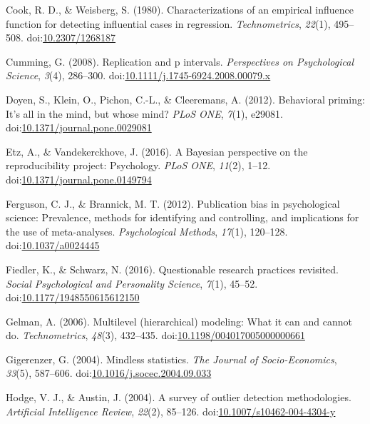 \documentclass[english,,man]{apa6}
\theoremstyle{definition}
\theoremstyle{definition}
\theoremstyle{definition}
\theoremstyle{remark}
\begin{document}
\hypertarget{ref-Cook1980}{}
Cook, R. D., \& Weisberg, S. (1980). Characterizations of an empirical
influence function for detecting influential cases in regression.
\emph{Technometrics}, \emph{22}(1), 495--508.
doi:\href{https://doi.org/10.2307/1268187}{10.2307/1268187}

\hypertarget{ref-Cumming2008}{}
Cumming, G. (2008). Replication and p intervals. \emph{Perspectives on
Psychological Science}, \emph{3}(4), 286--300.
doi:\href{https://doi.org/10.1111/j.1745-6924.2008.00079.x}{10.1111/j.1745-6924.2008.00079.x}

\hypertarget{ref-Doyen2012}{}
Doyen, S., Klein, O., Pichon, C.-L., \& Cleeremans, A. (2012).
Behavioral priming: It's all in the mind, but whose mind? \emph{PLoS
ONE}, \emph{7}(1), e29081.
doi:\href{https://doi.org/10.1371/journal.pone.0029081}{10.1371/journal.pone.0029081}

\hypertarget{ref-Etz2016}{}
Etz, A., \& Vandekerckhove, J. (2016). A Bayesian perspective on the
reproducibility project: Psychology. \emph{PLoS ONE}, \emph{11}(2),
1--12.
doi:\href{https://doi.org/10.1371/journal.pone.0149794}{10.1371/journal.pone.0149794}

\hypertarget{ref-Ferguson2012a}{}
Ferguson, C. J., \& Brannick, M. T. (2012). Publication bias in
psychological science: Prevalence, methods for identifying and
controlling, and implications for the use of meta-analyses.
\emph{Psychological Methods}, \emph{17}(1), 120--128.
doi:\href{https://doi.org/10.1037/a0024445}{10.1037/a0024445}

\hypertarget{ref-Fiedler2016}{}
Fiedler, K., \& Schwarz, N. (2016). Questionable research practices
revisited. \emph{Social Psychological and Personality Science},
\emph{7}(1), 45--52.
doi:\href{https://doi.org/10.1177/1948550615612150}{10.1177/1948550615612150}

\hypertarget{ref-Gelman2006}{}
Gelman, A. (2006). Multilevel (hierarchical) modeling: What it can and
cannot do. \emph{Technometrics}, \emph{48}(3), 432--435.
doi:\href{https://doi.org/10.1198/004017005000000661}{10.1198/004017005000000661}

\hypertarget{ref-Gigerenzer2004}{}
Gigerenzer, G. (2004). Mindless statistics. \emph{The Journal of
Socio-Economics}, \emph{33}(5), 587--606.
doi:\href{https://doi.org/10.1016/j.socec.2004.09.033}{10.1016/j.socec.2004.09.033}

\hypertarget{ref-Hodge2004}{}
Hodge, V. J., \& Austin, J. (2004). A survey of outlier detection
methodologies. \emph{Artificial Intelligence Review}, \emph{22}(2),
85--126.
doi:\href{https://doi.org/10.1007/s10462-004-4304-y}{10.1007/s10462-004-4304-y}
\end{document}
